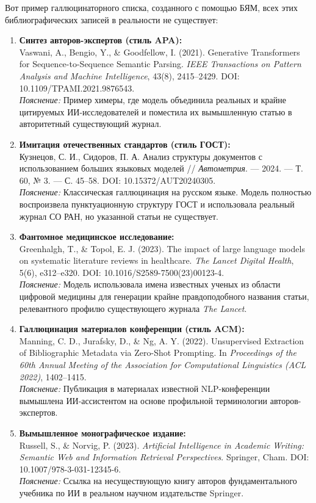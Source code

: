 Вот пример галлюцинаторного списка, созданного с помощью БЯМ, всех этих библиографических записей в реальности не существует:
\begin{enumerate}
    \item \textbf{Синтез авторов-экспертов (стиль APA):} \\
    Vaswani, A., Bengio, Y., \& Goodfellow, I. (2021). Generative Transformers for Sequence-to-Sequence Semantic Parsing. {\em IEEE Transactions on Pattern Analysis and Machine Intelligence}, 43(8), 2415--2429. DOI: 10.1109/TPAMI.2021.9876543. \\
    \textit{Пояснение:} Пример \guillemotleft химеры\guillemotright{}, где модель объединила реальных и крайне цитируемых ИИ-исследователей и поместила их вымышленную статью в авторитетный существующий журнал.

    \item \textbf{Имитация отечественных стандартов (стиль ГОСТ):} \\
    Кузнецов, С. И., Сидоров, П. А. Анализ структуры документов с использованием больших языковых моделей // {\em Автометрия}. --- 2024. --- Т. 60, № 3. --- С. 45--58. DOI: 10.15372/AUT20240305. \\
    \textit{Пояснение:} Классическая галлюцинация на русском языке. Модель полностью воспроизвела пунктуационную структуру ГОСТ и использовала реальный журнал СО РАН, но указанной статьи не существует.

    \item \textbf{Фантомное медицинское исследование:} \\
    Greenhalgh, T., \& Topol, E. J. (2023). The impact of large language models on systematic literature reviews in healthcare. {\em The Lancet Digital Health}, 5(6), e312--e320. DOI: 10.1016/S2589-7500(23)00123-4. \\
    \textit{Пояснение:} Модель использовала имена известных ученых из области цифровой медицины для генерации крайне правдоподобного названия статьи, релевантного профилю существующего журнала {\em The Lancet}.

    \item \textbf{Галлюцинация материалов конференции (стиль ACM):} \\
    Manning, C. D., Jurafsky, D., \& Ng, A. Y. (2022). Unsupervised Extraction of Bibliographic Metadata via Zero-Shot Prompting. In {\em Proceedings of the 60th Annual Meeting of the Association for Computational Linguistics (ACL 2022)}, 1402--1415. \\
    \textit{Пояснение:} Публикация в материалах известной NLP-конференции вымышлена ИИ-ассистентом на основе профильной терминологии авторов-экспертов.

    \item \textbf{Вымышленное монографическое издание:} \\
    Russell, S., \& Norvig, P. (2023). {\em Artificial Intelligence in Academic Writing: Semantic Web and Information Retrieval Perspectives}. Springer, Cham. DOI: 10.1007/978-3-031-12345-6. \\
    \textit{Пояснение:} Ссылка на несуществующую книгу авторов фундаментального учебника по ИИ в реальном научном издательстве Springer.
\end{enumerate}

